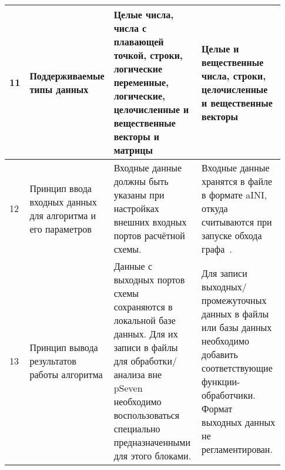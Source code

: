 \begin{landscape}
\begin{longtable}{|p{0.03\linewidth}|p{0.2\linewidth}|p{0.35\linewidth}|p{0.35\linewidth}|}
        11         & Поддерживаемые типы данных                                                                 & Целые числа, числа с плавающей точкой, строки, логические переменные, логические, целочисленные и вещественные векторы и матрицы                                                                                                                                                                                                                                                                                                                                                                                                                                                                                                                                  & Целые и вещественные числа, строки, целочисленные и вещественные векторы                                                                                                                                                                                                          \\
        \hline
        12         & Принцип ввода входных данных для алгоритма и его параметров                                & Входные данные должны быть указаны при настройках внешних входных портов расчётной схемы.                                                                                                                                                                                                                                                                                                                                                                                                                                                                                                                                                                         & Входные данные хранятся в файле в формате \gls{aINI}\cite{SokAINI}, откуда считываются при запуске обхода графа~\cite{SokolovPershin2017}.                                                                                                                                        \\
        \hline
        13         & Принцип вывода результатов работы алгоритма                                                & Данные с выходных портов схемы сохраняются в локальной базе данных. Для их записи в файлы для обработки/анализа вне pSeven необходимо воспользоваться специально предназначенными для этого блоками.                                                                                                                                                                                                                                                                                                                                                                                                                                                              & Для записи выходных/промежуточных данных в файлы или базы данных необходимо добавить соответствующие функции-обработчики. Формат выходных данных не регламентирован.                                                                                                              \\

\end{longtable}
\end{landscape}
